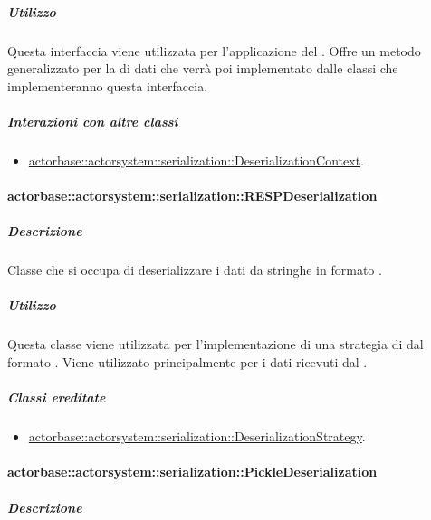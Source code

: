 \documentclass{scalatekids-article}
\begin{document}
\subparagraph{Utilizzo}

Questa interfaccia viene utilizzata per l'applicazione del 
. Offre un metodo generalizzato per la
 di dati che verrà poi implementato dalle classi che
implementeranno questa interfaccia.

\subparagraph{Interazioni con altre classi}

\begin{itemize}

\item \hyperref[sec:actorbase::actorsystem::serialization::DeserializationContext]{actorbase::actorsystem::serialization::DeserializationContext}.

\end{itemize}

\paragraph{actorbase::actorsystem::serialization::RESPDeserialization}
\label{sec:actorbase::actorsystem::serialization::RESPDeserialization}

\subparagraph{Descrizione}

Classe che si occupa di deserializzare i dati da stringhe in formato .

\subparagraph{Utilizzo}

Questa classe viene utilizzata per l'implementazione di una strategia di
 dal formato . Viene utilizzato
principalmente per i dati ricevuti dal .

\subparagraph{Classi ereditate}

\begin{itemize}

\item \hyperref[sec:actorbase::actorsystem::serialization::DeserializationStrategy]{actorbase::actorsystem::serialization::DeserializationStrategy}.

\end{itemize}

\paragraph{actorbase::actorsystem::serialization::PickleDeserialization}
\label{sec:actorbase::actorsystem::serialization::PickleDeserialization}

\subparagraph{Descrizione}
\end{document}
